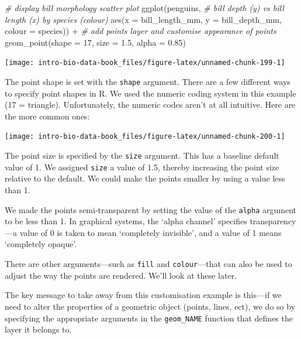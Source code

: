 \documentclass[
]{book}
\newenvironment{Shaded}{\begin{snugshade}}{\end{snugshade}}
\newcommand{\AttributeTok}[1]{\textcolor[rgb]{0.77,0.63,0.00}{#1}}
\newcommand{\CommentTok}[1]{\textcolor[rgb]{0.56,0.35,0.01}{\textit{#1}}}
\newcommand{\DecValTok}[1]{\textcolor[rgb]{0.00,0.00,0.81}{#1}}
\newcommand{\FloatTok}[1]{\textcolor[rgb]{0.00,0.00,0.81}{#1}}
\newcommand{\FunctionTok}[1]{\textcolor[rgb]{0.00,0.00,0.00}{#1}}
\newcommand{\NormalTok}[1]{#1}
\newcommand{\SpecialCharTok}[1]{\textcolor[rgb]{0.00,0.00,0.00}{#1}}
\begin{document}
\begin{Shaded}
\begin{Highlighting}[]
\CommentTok{\# display bill morphology scatter plot}
\FunctionTok{ggplot}\NormalTok{(penguins, }
       \CommentTok{\# bill depth (y) vs bill length (x) by species (colour)}
       \FunctionTok{aes}\NormalTok{(}\AttributeTok{x =}\NormalTok{ bill\_length\_mm, }\AttributeTok{y =}\NormalTok{ bill\_depth\_mm, }\AttributeTok{colour =}\NormalTok{ species)) }\SpecialCharTok{+} 
  \CommentTok{\# add points layer and customise appearance of points}
  \FunctionTok{geom\_point}\NormalTok{(}\AttributeTok{shape =} \DecValTok{17}\NormalTok{, }\AttributeTok{size =} \FloatTok{1.5}\NormalTok{, }\AttributeTok{alpha =} \FloatTok{0.85}\NormalTok{)}
\end{Highlighting}
\end{Shaded}

\begin{center}\texttt{[image: intro-bio-data-book\_files/figure-latex/unnamed-chunk-199-1]} \end{center}

The point shape is set with the \texttt{shape} argument. There are a few different ways to specify point shapes in R. We used the numeric coding system in this example (17 = triangle). Unfortunately, the numeric codes aren't at all intuitive. Here are the more common ones:

\begin{center}\texttt{[image: intro-bio-data-book\_files/figure-latex/unnamed-chunk-200-1]} \end{center}

The point size is specified by the \texttt{size} argument. This has a baseline default value of 1. We assigned \texttt{size} a value of 1.5, thereby increasing the point size relative to the default. We could make the points smaller by using a value less than 1.

We made the points semi-transparent by setting the value of the \texttt{alpha} argument to be less than 1. In graphical systems, the `alpha channel' specifies transparency---a value of 0 is taken to mean `completely invisible', and a value of 1 means `completely opaque'.

There are other arguments---such as \texttt{fill} and \texttt{colour}---that can also be used to adjust the way the points are rendered. We'll look at these later.

The key message to take away from this customisation example is this---if we need to alter the properties of a geometric object (points, lines, ect), we do so by specifying the appropriate arguments in the \texttt{geom\_NAME} function that defines the layer it belongs to.
\end{document}
